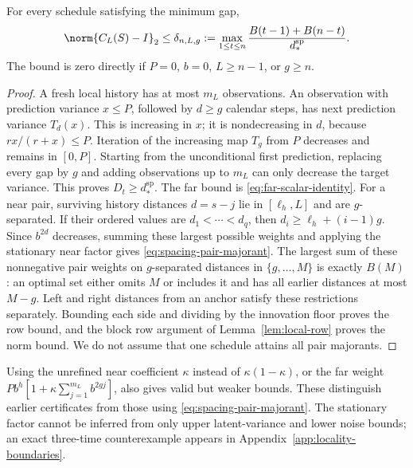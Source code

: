\begin{proposition}
\label{prop:spacing-locality}
For every schedule satisfying the minimum gap,
\begin{equation}
 \norm{C_L(S)-I}_2\le\delta_{n,L,g}:=
 \max_{1\le t\le n}\frac{B(t-1)+B(n-t)}{d_*^{\mathrm{sp}}}.
 \label{eq:spacing-delta}
\end{equation}
The bound is zero directly if $P=0$, $b=0$, $L\ge n-1$, or $g\ge n$.
\end{proposition}
\begin{proof}
A fresh local history has at most $m_L$ observations. An observation with
prediction variance $x\le P$, followed by $d\ge g$ calendar steps, has next
prediction variance $T_d(x)$. This is increasing in $x$; it is nondecreasing
in $d$, because $rx/(r+x)\le P$. Iteration of the increasing map $T_g$
from $P$ decreases and remains in $[0,P]$. Starting from the unconditional
first prediction, replacing every gap by $g$ and adding observations up to
$m_L$ can only decrease the target variance. This proves
$D_t\ge d_*^{\mathrm{sp}}$.
The far bound is \eqref{eq:far-scalar-identity}. For a near pair, surviving
history distances $d=s-j$ lie in $[\ell_h,L]$ and are $g$-separated. If
their ordered values are $d_1<\cdots<d_q$, then
$d_i\ge\ell_h+(i-1)g$. Since $b^{2d}$ decreases, summing these largest
possible weights and applying the stationary near factor gives
\eqref{eq:spacing-pair-majorant}.
The largest sum of these nonnegative pair weights on $g$-separated distances
in $\{g,\ldots,M\}$ is exactly $B(M)$: an optimal set either omits $M$ or
includes it and has all earlier distances at most $M-g$. Left and right
distances from an anchor satisfy these restrictions separately. Bounding
each side and dividing by the innovation floor proves the row bound,
and the block row argument of Lemma~\ref{lem:local-row} proves the norm
bound. We do not assume that one schedule attains all pair majorants.
\end{proof}

Using the unrefined near coefficient $\kappa$ instead of
$\kappa(1-\kappa)$, or the far weight
$Pb^h[1+\kappa\sum_{j=1}^{m_L}b^{2gj}]$, also gives valid but weaker
bounds. These distinguish earlier certificates from those using
\eqref{eq:spacing-pair-majorant}. The stationary factor cannot be inferred
from only upper latent-variance and lower noise bounds; an exact three-time
counterexample appears in Appendix~\ref{app:locality-boundaries}.

